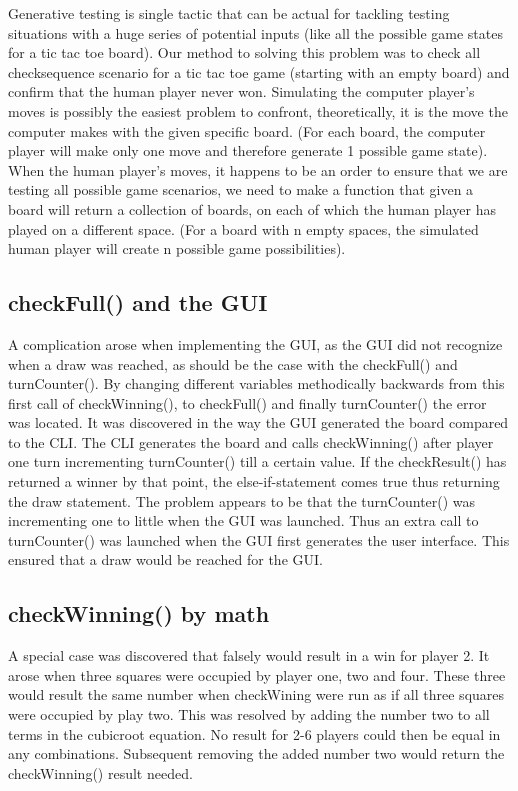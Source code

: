 \documentclass[a4paper,10pt]{article}
\begin{document}
	Generative testing is single tactic that can be actual for tackling testing situations with a huge series of potential inputs (like all the possible game states for a tic tac toe board).
Our method to solving this problem was to check all checksequence scenario for a tic tac toe game (starting with an empty board) and confirm that the human player never won.
Simulating the computer player’s moves is possibly the easiest problem to confront, theoretically, it is the move the computer makes with the given specific board. (For each board, the computer player will make only one move and therefore generate 1 possible game state).
When the human player’s moves, it happens to be an order to ensure that we are testing all possible game scenarios, we need to make a function that given a board will return a collection of boards, on each of which the human player has played on a different space. (For a board with n empty spaces, the simulated human player will create n possible game possibilities).

	\subsection{checkFull() and the GUI}
	A complication arose when implementing the GUI, as the GUI did not recognize when a draw was reached, as should be the case with the checkFull() and turnCounter(). By changing different variables methodically backwards from this first call of checkWinning(), to checkFull() and finally turnCounter() the error was located. It was discovered in the way the GUI generated the board compared to the CLI.  The CLI generates the board and calls checkWinning() after player one turn incrementing turnCounter() till a certain value. If the checkResult() has returned a winner by that point, the else-if-statement comes true thus returning the draw statement.  
	The problem appears to be that the turnCounter() was incrementing one to little when the GUI was launched. Thus an extra call to turnCounter() was launched when the GUI first generates the user interface. This ensured that a draw would be reached for the GUI.
	
	\subsection{checkWinning() by math}
	A special case was discovered that falsely would result in a win for player 2. It arose when three squares were occupied by player one, two and four. These three would result the same number when checkWining were run as if all three squares were occupied by play two.
	This was resolved by adding the number two to all terms in the cubicroot equation. No result for 2-6 players could then be equal in any combinations. Subsequent removing the added number two would return the checkWinning() result needed.
	
\end{document}
